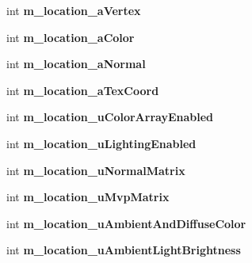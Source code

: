 \begin{DoxyCompactItemize}
\item 
\mbox{\label{class_g_l_e_s_renderer_ab03a79822dd105e1a0e5eecb65ee492b}} 
int {\bfseries m\+\_\+location\+\_\+a\+Vertex}
\item 
\mbox{\label{class_g_l_e_s_renderer_a5bf9f36f33237a7fe2706f60c341dec9}} 
int {\bfseries m\+\_\+location\+\_\+a\+Color}
\item 
\mbox{\label{class_g_l_e_s_renderer_adca575c93185a1beb32bf54235a7766f}} 
int {\bfseries m\+\_\+location\+\_\+a\+Normal}
\item 
\mbox{\label{class_g_l_e_s_renderer_af5b18a94719f0b93d32be7cd9262fcfb}} 
int {\bfseries m\+\_\+location\+\_\+a\+Tex\+Coord}
\item 
\mbox{\label{class_g_l_e_s_renderer_aafa0944ec42f35eb2ebf08fe0e850ad7}} 
int {\bfseries m\+\_\+location\+\_\+u\+Color\+Array\+Enabled}
\item 
\mbox{\label{class_g_l_e_s_renderer_a8d61c896b68041ae2439d21ed6981f28}} 
int {\bfseries m\+\_\+location\+\_\+u\+Lighting\+Enabled}
\item 
\mbox{\label{class_g_l_e_s_renderer_aec01e0adb9416c451d958f925a64d329}} 
int {\bfseries m\+\_\+location\+\_\+u\+Normal\+Matrix}
\item 
\mbox{\label{class_g_l_e_s_renderer_a51a95f6a35efdde4a6e103ecae334322}} 
int {\bfseries m\+\_\+location\+\_\+u\+Mvp\+Matrix}
\item 
\mbox{\label{class_g_l_e_s_renderer_a4125a33e9cea4fbc0e7e23edb4b4de43}} 
int {\bfseries m\+\_\+location\+\_\+u\+Ambient\+And\+Diffuse\+Color}
\item 
\mbox{\label{class_g_l_e_s_renderer_a0dc79f50f3eea91e32316a6ecd8a9754}} 
int {\bfseries m\+\_\+location\+\_\+u\+Ambient\+Light\+Brightness}
\item 
\mbox{\label{class_g_l_e_s_renderer_a0945edb3cd12c3228e405519d9cebe08}} 

\end{DoxyCompactItemize}

